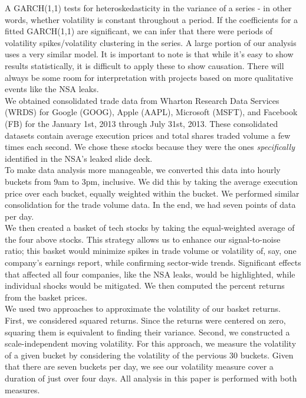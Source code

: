 \documentclass[11pt]{amsart}
\begin{document}
A GARCH(1,1) tests for heteroskedasticity in the variance of a series - in other words, whether volatility is constant throughout a period. If the coefficients for a fitted GARCH(1,1) are significant, we can infer that there were periods of volatility spikes/volatility clustering in the series. A large portion of our analysis uses a very similar model. It is important to note is that while it's easy to show results statistically, it is difficult to apply these to show causation. There will always be some room for interpretation with projects based on more qualitative events like the NSA leaks. \\

We obtained consolidated trade data from Wharton Research Data Services (WRDS) for Google (GOOG), Apple (AAPL), Microsoft (MSFT), and Facebook (FB) for the January 1st, 2013 through July 31st, 2013. These consolidated datasets contain average execution prices and total shares traded volume a few times each second. We chose these stocks because they were the ones  \textit{specifically} identified in the NSA's leaked slide deck. \\

To make data analysis more manageable, we converted this data into hourly buckets from 9am to 3pm, inclusive. We did this by taking the average execution price over each bucket, equally weighted within the bucket. We performed similar consolidation for the trade volume data. In the end, we had seven points of data per day. \\

We then created a basket of tech stocks by taking the equal-weighted average of the four above stocks. This strategy allows us to enhance our signal-to-noise ratio; this basket would minimize spikes in trade volume or volatility of, say, one company's earnings report, while confirming sector-wide trends. Significant effects that affected all four companies, like the NSA leaks, would be highlighted, while individual shocks would be mitigated. We then computed the percent returns from the basket prices. \\

We used two approaches to approximate the volatility of our basket returns. First, we considered squared returns. Since the returns were centered on zero, squaring them is equivalent to finding their variance. Second, we constructed a scale-independent moving volatility.  For this approach, we measure the volatility of a given bucket by considering the volatility of the pervious 30 buckets. Given that there are seven buckets per day, we see our volatility measure cover a duration of just over four days. All analysis in this paper is performed with both measures. \\
\end{document}

